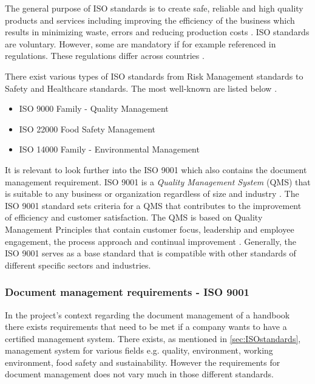 The general purpose of ISO standards is to create safe, reliable and high quality products and services including improving the efficiency of the business which results in minimizing waste, errors and reducing production costs \cite{ISOinfo}. %
ISO standards are voluntary.
However, some are mandatory if for example referenced in regulations.
These regulations differ across countries \cite{ISOreviewedevery5years}.

There exist various types of ISO standards from Risk Management standards to Safety and Healthcare standards. The most well-known are listed below \citep{ISOmostpopularlist}.

\begin{itemize}
	\item ISO 9000 Family - Quality Management
	\item ISO 22000 Food Safety Management
	\item ISO 14000 Family - Environmental Management
\end{itemize}

It is relevant to look further into the ISO 9001 which also contains the document management requirement.
ISO 9001 is a \textit{Quality Management System} (QMS) that is suitable to any business or organization regardless of size and industry \cite{ISO9001}.
The ISO 9001 standard sets criteria for a QMS that contributes to the improvement of efficiency and customer satisfaction.
The QMS is based on Quality Management Principles that contain customer focus, leadership and employee engagement, the process approach and continual improvement \cite{ISO9001-2}.
Generally, the ISO 9001 serves as a base standard that is compatible with other standards of different specific sectors and industries.

\subsubsection{Document management requirements - ISO 9001} \label{sec:DMR}
In the project's context regarding the document management of a handbook there exists requirements that need to be met if a company wants to have a certified management system.
There exists, as mentioned in \cref{sec:ISOstandards}, management system for various fields e.g. quality, environment, working environment, food safety and sustainability.
However the requirements for document management does not vary much in those different standards.

